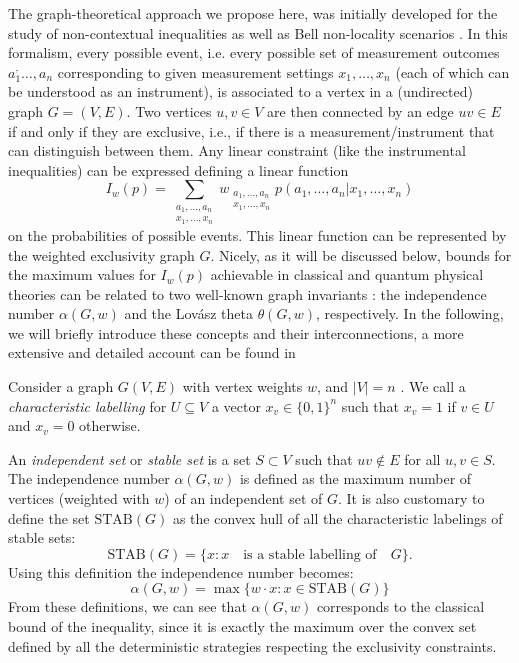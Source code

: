 \documentclass[letterpaper]{article}
\newcommand{\STAB}{\mathrm{STAB}}
\begin{document}
The graph-theoretical approach we propose here, was initially developed for the
study of non-contextual inequalities \cite{cabello2014} as well as Bell
non-locality scenarios \cite{acin2015}. 
In this formalism, every possible event, i.e. every possible set of measurement
outcomes $a_1^,\ldots, a_n$ corresponding to given measurement settings
$x_1,\ldots,x_n$ (each of which can be understood as an instrument), is
associated to a vertex in a (undirected) graph $G = (V, E)$. Two vertices $u, v
\in V$ are then connected by an edge $uv \in E$ if and only if they are
exclusive, i.e.,  if there is a measurement/instrument that can distinguish between
them. Any linear constraint (like the instrumental inequalities) can be
expressed defining a linear function
\begin{equation}
    I_w(p) = \sum_{\substack{a_1,\ldots,a_n\\x_1,\ldots,x_n}}
w_{\substack{a_1,\ldots,a_n\\x_1,\ldots,x_n}} p(a_1,\ldots,a_n|x_1,\ldots,x_n)
\end{equation}
on the probabilities of possible events. This linear function can be represented
by the weighted exclusivity graph $G$. Nicely, as it will be discussed below,
bounds for the maximum values for $ I_w(p)$ achievable in classical and quantum
physical theories can be related to two well-known graph invariants \cite{cabello2014}: the
independence number $\alpha(G, w)$ and the Lovász theta $\theta(G, w)$,
respectively. In the following, we will briefly introduce these concepts and
their interconnections, a more extensive and detailed account can be found in
\cite{cabello2014,rabelo2014,acin2015}

Consider a graph $G(V,E)$ with vertex weights $w$, and $|V| = n$ .
We call a \emph{characteristic labelling} for $U \subseteq V$ a vector $x_v \in
\{0,1\}^n$ such that $x_v = 1$ if $v \in U$ and $x_v = 0$ otherwise.

An \emph{independent set} or \emph{stable set} is a set
$S \subset V$ such that $uv \notin E$ for all $u,v \in S$.
The independence number $\alpha(G, w)$ is defined as the maximum number of
vertices (weighted with $w$) of an independent set of $G$. It is also customary to
define the set $\STAB(G)$ as the convex hull of all the
characteristic labelings of stable sets:
\begin{equation} 
    \STAB(G) = \{x : x \quad \text{is a stable labelling of}\quad G \}.
    \label{eq:stab}
\end{equation}
Using this definition the independence number becomes:
\begin{equation}
    \alpha(G,w) = \max\{w\cdot x: x \in \STAB(G)\}
    \label{eq:alphastab}
\end{equation}
From these definitions, we can see that $\alpha(G,w)$ corresponds to the classical bound of the inequality, since it is exactly the maximum over the convex set defined by all the deterministic strategies respecting the exclusivity constraints.
\end{document}
